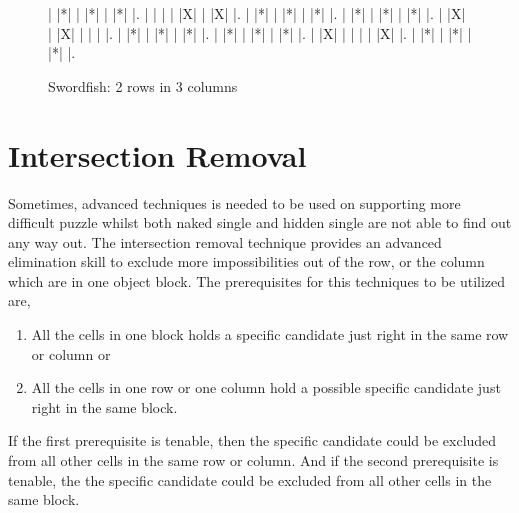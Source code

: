 \documentclass[11pt]{report}
\begin{document}
\begin{figure}
\begin{sudoku}
| |*| | |*| | |*| |.
| | | | |X| | |X| |.
| |*| | |*| | |*| |.
| |*| | |*| | |*| |.
| |X| | |X| | | | |.
| |*| | |*| | |*| |.
| |*| | |*| | |*| |.
| |X| | | | | |X| |.
| |*| | |*| | |*| |.
\end{sudoku}
\caption{Swordfish: 2 rows in 3 columns}
\label{fig:swordfish23}
\end{figure}


\section{Intersection Removal}
\label{sec:Intersection Removal}
Sometimes, advanced techniques is needed to be used on supporting more difficult puzzle whilst both naked single and hidden single are not able to find out any way out. The intersection removal technique provides an advanced elimination skill to exclude more impossibilities out of the row, or the column which are in one object block. The prerequisites for this techniques to be utilized are, 
\begin{enumerate}
\item All the cells in one block holds a specific candidate just right in the same row or column or
\item All the cells in one row or one column hold a possible specific candidate just right in the same block.
\end{enumerate}
If the first prerequisite is tenable, then the specific candidate could be excluded from all other cells in the same row or column. And if the second prerequisite is tenable, the the specific candidate could be excluded from all other cells in the same block. 
\end{document}
